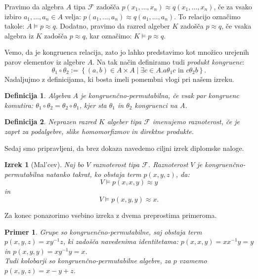 \documentclass[a4paper,11pt]{article}
\newtheorem{izrek}{Izrek}
\newtheorem{definicija}{Definicija}
\newtheorem{primer}{Primer}
\begin{document}
Pravimo da algebra $A$ tipa $\mathcal{F}$ zadošča $p\left(x_1, \ldots, x_n\right)\approx q\left(x_1, \ldots, x_n\right)$,
če za vsako izbiro $a_1, \ldots, a_n \in A$ velja: $p\left(a_1, \ldots, a_n\right) \approx q\left(a_1, 
\ldots, a_n\right)$. To relacijo označimo takole: $A \models p \approx q$. Dodatno, pravimo da razred algeber $K$ 
zadošča $p \approx q$, če vsaka algebra iz $K$ zadošča $p \approx q$, kar označimo: $K \models p \approx q$.



Vemo, da je kongruenca relacija, zato jo lahko predstavimo kot množico urejenih parov elementov iz algebre $A$. 
Na tak način definiramo tudi \emph{produkt kongruenc}:
    $$\theta_1 \circ \theta_2 := \left\{\left(a, b\right) \in A \times A \mathrel{|} \exists c \in A. a \mathrel{\theta_1} 
    c \text{ in } c \mathrel{\theta_2} b\right\}.$$
    Nadaljujmo z definicijama, ki bosta imeli pomembni vlogi pri našem izreku.

\begin{definicija}
    Algebra $A$ je \emph{kongruenčno-permutabilna}, če vsak par kongruenc komutira: $\theta_1 \circ \theta_2 =
    \theta_2 \circ \theta_1$, kjer sta $\theta_1$ in $\theta_2$ kongruenci na A. 
\end{definicija}

\begin{definicija}
    Neprazen razred $K$ algeber tipa $\mathcal{F}$ imenujemo \emph{raznoterost}, če je zaprt za podalgebre, 
    slike homomorfizmov in direktne produkte.
\end{definicija}

Sedaj smo pripravljeni, da brez dokaza navedemo ciljni izrek diplomske naloge.

\begin{izrek}[Mal'cev] Naj bo $V$ raznoterost tipa $\mathcal{F}$. Raznoterost $V$ je kongruenčno-permutabilna
    natanko takrat, ko obstaja term $p\left(x, y, z\right)$, da: \\ $$V \models p\left(x,x,y\right)\approx y$$ 
    in $$V \models p\left(x,y,y\right)\approx x.$$   
\end{izrek}

Za konec ponazorimo vsebino izreka z dvema preprostima primeroma. \nocite{Burris_Sankappanavar_1981}

\begin{primer}
    Grupe so kongruenčno-permutabilne, saj obstaja term $p(x,y,z)=xy^{-1}z$, ki zadošča navedenima identitetama:
    $p(x,x,y)= xx^{-1}y=y$ in $p(x, y, y)=xy^{-1}y=x$.\\
    Tudi kolobarji so kongruenčno-permutabilne algebre, za $p$ vzamemo $p(x,y,z)= x-y+z$.
\end{primer}

\printbibliography
\end{document}

